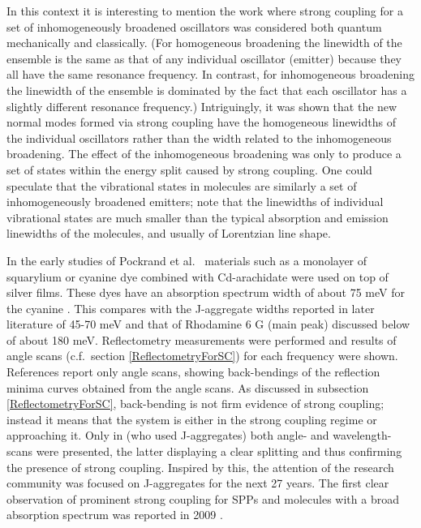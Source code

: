 \documentclass[12pt]{iopart}
\begin{document}
In this context it is interesting to mention the work \cite{Houdre1996} where 
strong coupling for a set of inhomogeneously broadened oscillators was considered both quantum mechanically and classically. (For homogeneous broadening the linewidth of the ensemble is the same as that of any individual oscillator (emitter) because they all have the same resonance frequency. In contrast, for inhomogeneous broadening the linewidth of the ensemble is dominated by the fact that each oscillator has a slightly different resonance frequency.) Intriguingly, it was shown that the new normal modes formed via strong coupling have the homogeneous linewidths of the individual oscillators rather than the width related to the inhomogeneous broadening. The effect of the inhomogeneous broadening was only to produce a set of states within the energy split caused by strong coupling. One could speculate that the vibrational states in molecules are similarly a set of inhomogeneously broadened emitters; note that the linewidths of individual vibrational states are much smaller than the typical absorption and emission linewidths of the molecules, and usually of Lorentzian line shape.

In the early studies of Pockrand et al.\ \cite{Pockrand1978,Pockrand21978} materials such as a monolayer of squarylium \cite{Pockrand21978} or cyanine \cite{Pockrand1978} dye combined with Cd-arachidate were used on top of silver films. These dyes have an absorption spectrum width of about 75 meV for the cyanine \cite{Pockrand_JChemPhys_1982_77_6289}. This compares with the J-aggregate widths reported in later literature of 45-70 meV and that of Rhodamine 6 G (main peak) discussed below of about 180 meV. Reflectometry measurements were performed and results of angle scans (c.f.\ section \ref{ReflectometryForSC}) for each frequency were shown. References \cite{Pockrand1978,Pockrand21978} report only angle scans, showing back-bendings of the reflection minima curves obtained from the angle scans. As discussed in subsection \ref{ReflectometryForSC}, back-bending is not firm evidence of strong coupling; instead it means that the system is either in the strong coupling regime or approaching it. Only in \cite{Pockrand1982} (who used J-aggregates) both angle- and wavelength-scans were presented, the latter displaying a clear splitting and thus confirming the presence of strong coupling. Inspired by this, the attention of the research community was focused on J-aggregates for the next 27 years. The first clear observation of prominent strong coupling for SPPs and molecules with a broad absorption spectrum was reported in 2009 \cite{Hakala2009}.
\end{document}
